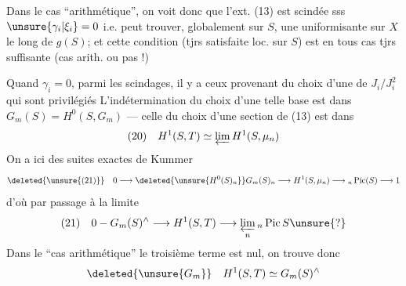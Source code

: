 Dans le cas ``arithmétique'', on voit donc que l'ext. (13) est scindée sss $\unsure{\gamma_i|\xi_i}=0$ i.e.  peut trouver, globalement sur $S$, une uniformisante sur $X$ le long de $g(S)$; et cette condition (tjrs satisfaite loc. sur $S$) est en tous cas tjrs suffisante (cas arith. ou pas !)

Quand $\gamma_i=0$, parmi les scindages, il y a ceux provenant du choix d'une  de $J_i/J_i^2$ qui sont privilégiés L'indétermination du choix d'une telle base est dans $G_m(S)=H^0(S,G_m)$ --- celle du choix d'une section de (13) est dans
\[
(20)\quad H^1(S,T)\simeq\varprojlim H^1(S,\mu_n)
\]
On a ici des suites exactes de Kummer
\[
\deleted{\unsure{(21)}}\quad 0\longrightarrow\deleted{\unsure{H^0(S)_n}}G_m(S)_n\longrightarrow H^1(S,\mu_n)\longrightarrow{}_n\operatorname{Pic}(S)\longrightarrow1
\]
d'où par passage à la limite
\[
(21)\quad 0-G_m(S)^\wedge\longrightarrow H^1(S,T)\longrightarrow\varprojlim_n{}_n\operatorname{Pic}S\unsure{?}
\]
Dans le ``cas arithmétique'' le troisième terme est nul, on trouve donc
\[
\deleted{\unsure{G_m}}\quad H^1(S,T)\simeq G_m(S)^\wedge
\]
